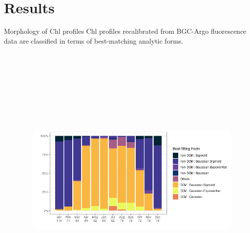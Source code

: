 \documentclass[final]{beamer}
\begin{document}
\begin{frame}[fragile]
\begin{columns}[T]
      
      \begin{column}{.64\textwidth}
       \section{Results}
      

	\begin{block}{Morphology of Chl profiles}
	Chl profiles recalibrated from BGC-Argo fluorescence data are classified in terms of best-matching analytic forms. 
	  \begin{columns}[T]
	    \begin{column}{.32\textwidth}
	   

	    \end{column}
	    
	    \begin{column}{.32\textwidth}
	      \begin{figure}
     		\includegraphics[height=13cm]{figs/FIG3.png}
		    \end{figure}
	    \end{column}
	  

\end{columns}
\end{block}
\end{column}
\end{columns}
\end{frame}
\end{document}
